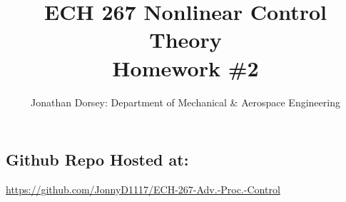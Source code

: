 \documentclass[12px]{article}
\begin{document}
    \title{ECH 267 Nonlinear Control Theory \\ Homework \#2  }

    \author{Jonathan Dorsey: Department of Mechanical \& Aerospace Engineering}


    \maketitle


    \begin{center}
        \section*{Github Repo Hosted at: }
        \url{https://github.com/JonnyD1117/ECH-267-Adv.-Proc.-Control}
    \end{center}


























\end{document}
